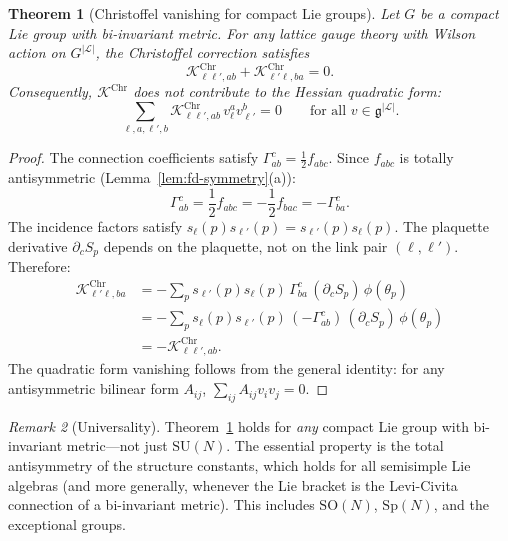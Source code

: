 \documentclass[11pt,a4paper]{article}
\theoremstyle{plain}
\newtheorem{theorem}{Theorem}[section]
\theoremstyle{definition}
\theoremstyle{remark}
\newtheorem{remark}[theorem]{Remark}
\newcommand{\SU}{\mathrm{SU}}
\newcommand{\cK}{\mathcal{K}}
\newcommand{\cL}{\mathcal{L}}
\begin{document}
\begin{theorem}[Christoffel vanishing for compact Lie groups]\label{thm:christoffel}
Let $G$ be a compact Lie group with bi-invariant metric. For
any lattice gauge theory with Wilson action on
$G^{|\cL|}$, the Christoffel correction satisfies
\begin{equation}
\cK^{\mathrm{Chr}}_{\ell\ell',ab}
+ \cK^{\mathrm{Chr}}_{\ell'\ell,ba} = 0.
\end{equation}
Consequently, $\cK^{\mathrm{Chr}}$ does not contribute to the
Hessian quadratic form:
\begin{equation}\label{eq:christoffel-vanishing}
\sum_{\ell,a,\ell',b}
\cK^{\mathrm{Chr}}_{\ell\ell',ab}\,v_\ell^a v_{\ell'}^b = 0
\qquad \text{for all } v \in \mathfrak{g}^{|\cL|}.
\end{equation}
\end{theorem}

\begin{proof}
The connection coefficients satisfy $\Gamma^c_{ab} =
\frac{1}{2}f_{abc}$. Since $f_{abc}$ is totally antisymmetric
(Lemma~\ref{lem:fd-symmetry}(a)):
\begin{equation}
\Gamma^c_{ab} = \frac{1}{2}f_{abc}
= -\frac{1}{2}f_{bac} = -\Gamma^c_{ba}.
\end{equation}
The incidence factors satisfy
$s_\ell(p)s_{\ell'}(p) = s_{\ell'}(p)s_\ell(p)$.
The plaquette derivative $\partial_c S_p$ depends on the
plaquette, not on the link pair $(\ell,\ell')$.
Therefore:
\begin{align}
\cK^{\mathrm{Chr}}_{\ell'\ell,ba}
&= -\sum_p s_{\ell'}(p)s_\ell(p)\,\Gamma^c_{ba}\,
(\partial_c S_p)\,\phi(\theta_p) \\
&= -\sum_p s_\ell(p)s_{\ell'}(p)\,(-\Gamma^c_{ab})\,
(\partial_c S_p)\,\phi(\theta_p) \\
&= -\cK^{\mathrm{Chr}}_{\ell\ell',ab}.
\end{align}
The quadratic form vanishing follows from the general identity:
for any antisymmetric bilinear form $A_{ij}$,
$\sum_{ij} A_{ij}v_i v_j = 0$.
\end{proof}

\begin{remark}[Universality]
Theorem~\ref{thm:christoffel} holds for \emph{any} compact Lie
group with bi-invariant metric---not just $\SU(N)$. The
essential property is the total antisymmetry of the structure
constants, which holds for all semisimple Lie algebras (and more
generally, whenever the Lie bracket is the Levi-Civita connection
of a bi-invariant metric). This includes $\mathrm{SO}(N)$,
$\mathrm{Sp}(N)$, and the exceptional groups.
\end{remark}
\end{document}
